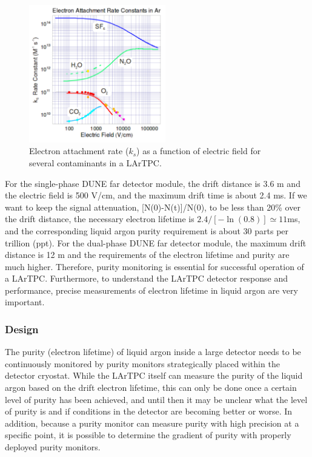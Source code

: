 \begin{figure}[h]
\centering
\includegraphics[height=6cm]{figures/PrMon_ks.pdf}
\caption{Electron attachment rate ($k_s$) as a function of electric field for several contaminants in a LArTPC.}\label{fig:ks}
\end{figure}


For the single-phase DUNE far detector module, the drift distance is 3.6 m and the electric field is 500 V/cm, and the maximum drift time is about 2.4 ms. If we want to keep the signal attenuation, [N(0)-N(t)]/N(0), to be less than  20\% over the drift distance, the necessary electron lifetime is $2.4/[-\ln(0.8)] \simeq 11 $ms, and the corresponding liquid argon purity requirement is about 30 parts per trillion (ppt). For the dual-phase DUNE far detector module, the maximum drift distance is 12 m and the requirements of the electron lifetime and purity are much higher. Therefore, purity monitoring is essential for successful operation of a LArTPC. Furthermore, to understand the LArTPC detector response and performance, precise measurements of electron lifetime in liquid argon are very important.

\subsubsection{Design}



The purity (electron lifetime) of liquid argon inside a large detector needs to be continuously monitored by purity monitors strategically placed within the detector cryostat. While the LArTPC itself can measure the purity of the liquid argon based on the drift electron lifetime, this can only be done once a certain level of purity has been achieved, and until then it may be unclear what the level of purity is and if conditions in the detector are becoming better or worse. In addition, because a purity monitor can measure purity with high precision at a specific point, it is possible to determine the gradient of purity with properly deployed purity monitors.


